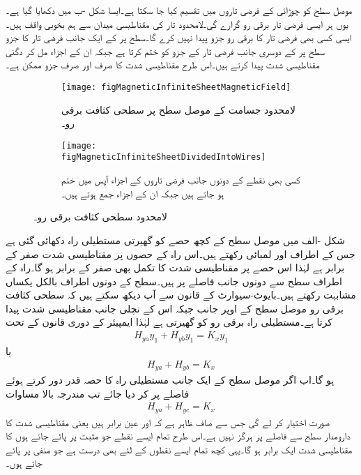 موصل سطح کو  چوڑائی کے فرضی تاروں میں تقسیم کیا جا سکتا ہے۔ایسا شکل -ب میں دکھایا گیا ہے۔یوں ہر ایسی فرضی تار  برقی رو گزارے گی۔لامحدود تار کی مقناطیسی میدان سے ہم بخوبی واقف ہیں۔ایسی کسی بھی فرضی تار کا برقی رو  جزو پیدا نہیں کرے گا۔سطح پر  کے ایک جانب فرضی تار کا  جزو سطح پر  کے دوسری جانب فرضی تار کے  جزو کو ختم کرتا ہے جبکہ ان  کے  اجزاء مل کر دگنی مقناطیسی شدت پیدا کرتے ہیں۔اس طرح مقناطیسی شدت کا صرف اور صرف  جزو ممکن ہے۔

\begin{figure}
\centering
\begin{subfigure}{0.5\textwidth}
\centering
\texttt{[image: figMagneticInfiniteSheetMagneticField]}
\caption{لامحدود جسامت کے موصل سطح پر سطحی کثافت برقی رو۔}
\label{شکل_مقناطیسی_لامحدود_سطحی_برقی_رو}
\end{subfigure}%
%
\begin{subfigure}{0.5\textwidth}
\centering
\texttt{[image: figMagneticInfiniteSheetDividedIntoWires]}
\caption{کسی بھی نقطے کے دونوں جانب فرضی تاروں کے  اجزاء آپس میں ختم ہو جاتے ہیں جبکہ ان کے  اجزاء جمع ہوتے ہیں۔}
\label{شکل_مقناطیسی_دونوں_جانب_زیڈ_اجزاء_ختم}
\end{subfigure}%
\caption{لامحدود سطحی کثافت برقی رو۔}
\label{شکل_مقناطیسی_لامحدود_سطحی_کثافت_برقی_رو}
\end{figure}
شکل -الف میں موصل سطح کے کچھ حصے کو گھیرتی مستطیلی راہ  دکھائی گئی ہے جس کے اطراف  اور  لمبائی رکھتے ہیں۔اس راہ کے  حصوں پر مقناطیسی شدت صفر کے برابر ہے لہٰذا اس حصے پر مقناطیسی شدت کا تکمل بھی صفر کے برابر ہو گا۔راہ کے  اطراف سطح سے دونوں جانب  فاصلے پر ہیں۔سطح کے دونوں اطراف بالکل یکساں مشابہت رکھتے ہیں۔بایوٹ-سیوارٹ کے قانون سے آپ دیکھ سکتے ہیں کہ سطحی کثافت برقی رو  موصل سطح کے اوپر جانب  جبکہ اس کے نچلی جانب   مقناطیسی شدت پیدا کرتا ہے۔مستطیلی راہ  برقی رو کو گھیرتی ہے لہٰذا ایمپیئر کے دوری قانون کے تحت
\begin{align*}
H_{ya} y_1+H_{yb} y_1=K_x y_1
\end{align*} 
یا
\begin{align}\label{مساوات_مقناطیسی_لامحدود_دونوں_اطراف}
H_{ya} +H_{yb}=K_x
\end{align} 
ہو گا۔اب اگر موصل سطح کے ایک جانب مستطیلی راہ کا  حصہ قدر دور کرتے ہوئے  فاصلے پر کر دیا جائے تب مندرجہ بالا مساوات 
\begin{align*}
H_{ya} +H_{yc}=K_x
\end{align*} 
صورت اختیار کر لے گی جس سے صاف ظاہر ہے کہ  اور  عین برابر ہیں یعنی مقناطیسی شدت کا دارومدار سطح سے فاصلے پر ہرگز نہیں ہے۔اس طرح تمام ایسے نقطے جو مثبت  پر پائے جاتے ہوں کا مقناطیسی شدت ایک برابر ہو گا۔یہی کچھ تمام ایسے نقطوں کے لئے بھی درست ہے جو منفی  پر پائے جاتے ہوں۔ 

